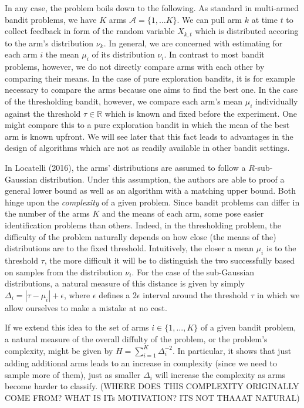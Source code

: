 \documentclass[12pt,]{article}
\begin{document}
In any case, the problem boils down to the following. As standard in
multi-armed bandit problems, we have \(K\) arms
\(\mathcal{A} = \{1, \dots K\}\). We can pull arm \(k\) at time \(t\) to
collect feedback in form of the random variable \(X_{k,t}\) which is
distributed accoring to the arm's distribution \(\nu_k\). In general, we
are concerned with estimating for each arm \(i\) the mean \(\mu_i\) of
its distribution \(\nu_i\). In contrast to most bandit problems,
however, we do not directly compare arms with each other by comparing
their means. In the case of pure exploration bandits, it is for example
necessary to compare the arms because one aims to find the best one. In
the case of the thresholding bandit, however, we compare each arm's mean
\(\mu_i\) individually against the threshold \(\tau \in \mathbb{R}\)
which is known and fixed before the experiment. One might compare this
to a pure exploration bandit in which the mean of the best arm is known
upfront. We will see later that this fact leads to advantages in the
design of algorithms which are not as readily available in other bandit
settings.

In Locatelli (2016), the arms' distributions are assumed to follow a
\(R\)-sub-Gaussian distribution. Under this assumption, the authors are
able to proof a general lower bound as well as an algorithm with a
matching upper bound. Both hinge upon the \emph{complexity} of a given
problem. Since bandit problems can differ in the number of the arms
\(K\) and the means of each arm, some pose easier identification
problems than others. Indeed, in the thresholding problem, the
difficulty of the problem naturally depends on how close (the means of
the) distributions are to the fixed threshold. Intuitively, the closer a
mean \(\mu_i\) is to the threshold \(\tau\), the more difficult it will
be to distinguish the two successfully based on samples from the
distribution \(\nu_i\). For the case of the sub-Gaussian distributions,
a natural measure of this distance is given by simply
\(\Delta_i = |\tau - \mu_i| + \epsilon\), where \(\epsilon\) defines a
\(2\epsilon\) interval around the threshold \(\tau\) in which we allow
ourselves to make a mistake at no cost.

If we extend this idea to the set of arms \(i \in \{1,...,K\}\) of a
given bandit problem, a natural measure of the overall diffulty of the
problem, or the problem's complexity, might be given by
\(H = \sum_{i=1}^{K} \Delta_i^{-2}\). In particular, it shows that just
adding additional arms leads to an increase in complexity (since we need
to sample more of them), just as smaller \(\Delta_i\) will increase the
complexity as arms become harder to classify. (WHERE DOES THIS
COMPLEXITY ORIGINALLY COME FROM? WHAT IS ITs MOTIVATION? ITS NOT THAAAT
NATURAL)
\end{document}
